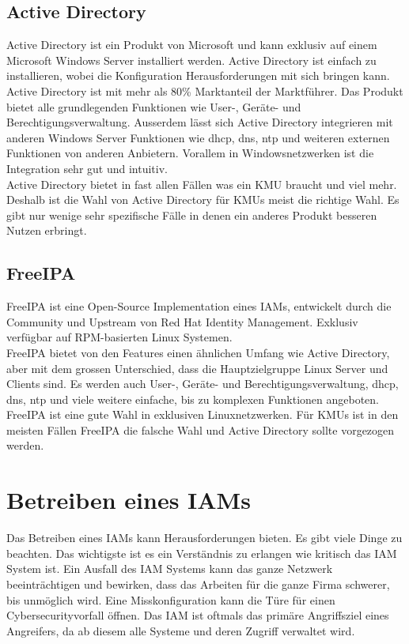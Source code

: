 \subsection{Active Directory}
Active Directory ist ein Produkt von Microsoft und kann exklusiv auf einem Microsoft Windows Server installiert werden. Active Directory ist einfach zu installieren, wobei die Konfiguration Herausforderungen mit sich bringen kann.\\

Active Directory ist mit mehr als 80\% Marktanteil der Marktführer.
Das Produkt bietet alle grundlegenden Funktionen wie User-, Geräte- und Berechtigungsverwaltung.
Ausserdem lässt sich Active Directory integrieren mit anderen Windows Server Funktionen wie \acrshort{dhcp}, \acrshort{dns}, \acrshort{ntp} und weiteren externen Funktionen von anderen Anbietern.
Vorallem in Windowsnetzwerken ist die Integration sehr gut und intuitiv.\\


Active Directory bietet in fast allen Fällen was ein KMU braucht und viel mehr. Deshalb ist die Wahl von Active Directory für KMUs meist die richtige Wahl. Es gibt nur wenige sehr spezifische Fälle in denen ein anderes Produkt besseren Nutzen erbringt.


\subsection{FreeIPA}
FreeIPA ist eine Open-Source Implementation eines IAMs, entwickelt durch die Community und Upstream von Red Hat Identity Management. Exklusiv verfügbar auf RPM-basierten Linux Systemen.\\

FreeIPA bietet von den Features einen ähnlichen Umfang wie Active Directory, aber mit dem grossen Unterschied, dass die Hauptzielgruppe Linux Server und Clients sind. Es werden auch User-, Geräte- und Berechtigungsverwaltung, \acrshort{dhcp}, \acrshort{dns}, \acrshort{ntp} und viele weitere einfache, bis zu komplexen Funktionen angeboten.\\

FreeIPA ist eine gute Wahl in exklusiven Linuxnetzwerken. Für KMUs ist in den meisten Fällen FreeIPA die falsche Wahl und Active Directory sollte vorgezogen werden.


\section{Betreiben eines IAMs}
Das Betreiben eines IAMs kann Herausforderungen bieten.
Es gibt viele Dinge zu beachten.
Das wichtigste ist es ein Verständnis zu erlangen wie kritisch das IAM System ist.
Ein Ausfall des IAM Systems kann das ganze Netzwerk beeinträchtigen und bewirken, dass das Arbeiten für die ganze Firma schwerer, bis unmöglich wird.
Eine Misskonfiguration kann die Türe für einen Cybersecurityvorfall öffnen.
Das IAM ist oftmals das primäre Angriffsziel eines Angreifers, da ab diesem alle Systeme und deren Zugriff verwaltet wird.\\


